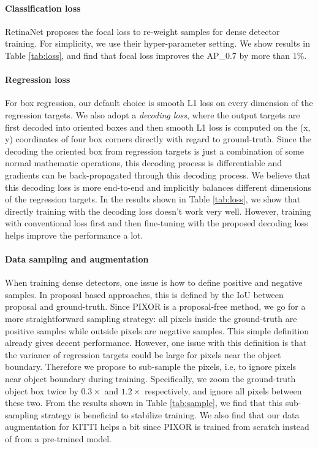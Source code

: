 \vspace{-0.2cm}
\paragraph{Classification loss} RetinaNet \cite{focal} proposes the focal loss to re-weight samples for dense detector training. For simplicity, we use their hyper-parameter setting. We show results in Table \ref{tab:loss}, and find that focal loss improves the AP\_0.7 by more than 1\%.

\vspace{-0.2cm}
\paragraph{Regression loss} For box regression, our default choice is smooth L1 loss \cite{frcn} on every dimension of the regression targets. We also adopt a {\it decoding loss}, where the output targets are first decoded into oriented boxes and then smooth L1 loss is computed on the (x, y) coordinates of four box corners directly with regard to ground-truth. Since the decoding the oriented box from regression targets is just a combination of some normal mathematic operations, this decoding process is differentiable and gradients can be back-propagated through this decoding process. We believe that this decoding loss is more end-to-end and implicitly balances different dimensions of the regression targets. In the results shown in Table \ref{tab:loss}, we show that directly training with the decoding loss doesn't work very well. However, training with conventional loss first and then fine-tuning with the proposed decoding loss helps improve the performance a lot.

\vspace{-0.2cm}
\paragraph{Data sampling and augmentation} 
When training dense detectors, one issue is how to define positive and negative samples. In proposal based approaches, this is defined by the IoU between proposal and ground-truth. Since PIXOR is a proposal-free method, we go for a more straightforward sampling strategy: all pixels inside the ground-truth are positive samples while outside pixels are negative samples. This simple definition already gives decent performance. However, one issue with this definition is that the variance of regression targets could be large for pixels near the object boundary. Therefore we propose to sub-sample the pixels, i.e, to ignore pixels near object boundary during training. Specifically, we zoom the ground-truth object box twice by $0.3\times$ and $1.2\times$ respectively, and ignore all pixels between these two. From the results shown in Table \ref{tab:sample}, we find that this sub-sampling strategy is beneficial to stabilize training. We also find that our data augmentation for KITTI helps a bit since PIXOR is trained from scratch instead of from a pre-trained model.

